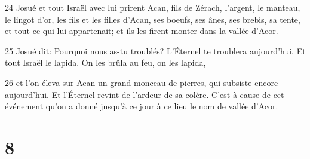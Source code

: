 \par 24 Josué et tout Israël avec lui prirent Acan, fils de Zérach, l'argent, le manteau, le lingot d'or, les fils et les filles d'Acan, ses boeufs, ses ânes, ses brebis, sa tente, et tout ce qui lui appartenait; et ils les firent monter dans la vallée d'Acor.
\par 25 Josué dit: Pourquoi nous as-tu troublés? L'Éternel te troublera aujourd'hui. Et tout Israël le lapida. On les brûla au feu, on les lapida,
\par 26 et l'on éleva sur Acan un grand monceau de pierres, qui subsiste encore aujourd'hui. Et l'Éternel revint de l'ardeur de sa colère. C'est à cause de cet événement qu'on a donné jusqu'à ce jour à ce lieu le nom de vallée d'Acor.

\chapter{8}

